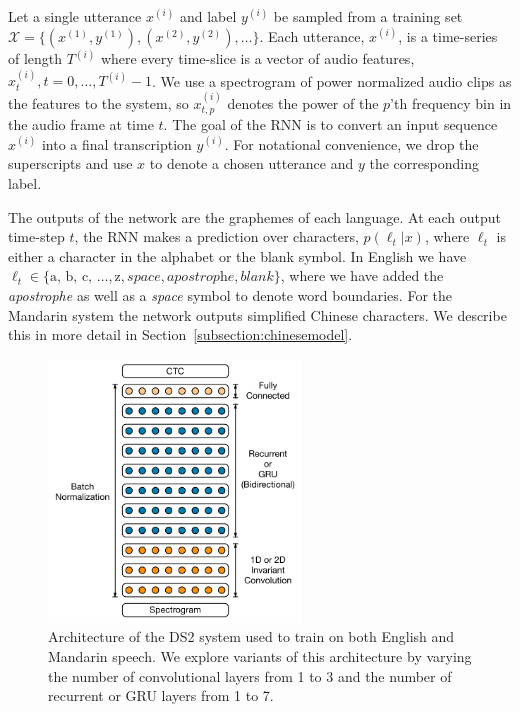 \documentclass{article}
\begin{document}
Let a single utterance $x^{(i)}$ and label $y^{(i)}$ be sampled from a training set $\mathcal{X} = \{(x^{(1)},y^{(1)}),(x^{(2)},y^{(2)}),\ldots\}$. Each utterance, $x^{(i)}$, is a time-series of length $T^{(i)}$ where every time-slice is a vector of audio features, $x_t^{(i)},  t=0,\ldots,T^{(i)}-1$. We use a spectrogram of power normalized audio clips as the features to the system, so $x^{(i)}_{t,p}$ denotes the power of the $p$'th frequency bin in the audio frame at time $t$. The goal of the RNN is to convert an input sequence $x^{(i)}$ into a final transcription $y^{(i)}$. For notational convenience, we drop the superscripts and use $x$ to denote a chosen utterance and $y$ the corresponding label.

The outputs of the network are the graphemes of each language. At each output time-step $t$, the RNN makes a prediction over characters, $p(\ell_t | x)$, where $\ell_t$ is either a character in the alphabet or the blank symbol. In English we have $\ell_t \in \{\textrm{a, b, c, }\ldots, \textrm{z}, \textit{space}, \textit{apostrophe}, \textit{blank}\}$, where we have added the \textit{apostrophe} as well as a \textit{space} symbol to denote word boundaries. For the Mandarin system the network outputs simplified Chinese characters.  We describe this in more detail in Section~\ref{subsection:chinesemodel}.

\begin{figure}[h]
    \centering
    \includegraphics[width=0.6\textwidth]{DS2_network.pdf}
    \caption{Architecture of the DS2 system used to train on both English and Mandarin speech. We explore variants of this architecture by varying the number of convolutional layers from 1 to 3 and the number of recurrent or GRU layers from 1 to 7.}
    \label{fig:ds2-network}
\end{figure}
\end{document}
